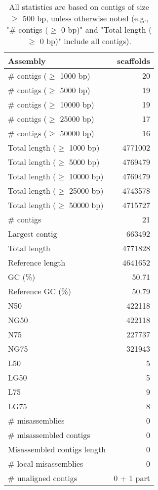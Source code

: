 \documentclass[12pt,a4paper]{article}
\begin{document}
\begin{table}[ht]
\begin{center}
\caption{All statistics are based on contigs of size $\geq$ 500 bp, unless otherwise noted (e.g., "\# contigs ($\geq$ 0 bp)" and "Total length ($\geq$ 0 bp)" include all contigs).}
\begin{tabular}{|l*{1}{|r}|}
\hline
Assembly & scaffolds \\ \hline
\# contigs ($\geq$ 1000 bp) & 20 \\ \hline
\# contigs ($\geq$ 5000 bp) & 19 \\ \hline
\# contigs ($\geq$ 10000 bp) & 19 \\ \hline
\# contigs ($\geq$ 25000 bp) & 17 \\ \hline
\# contigs ($\geq$ 50000 bp) & 16 \\ \hline
Total length ($\geq$ 1000 bp) & 4771002 \\ \hline
Total length ($\geq$ 5000 bp) & 4769479 \\ \hline
Total length ($\geq$ 10000 bp) & 4769479 \\ \hline
Total length ($\geq$ 25000 bp) & 4743578 \\ \hline
Total length ($\geq$ 50000 bp) & 4715727 \\ \hline
\# contigs & 21 \\ \hline
Largest contig & 663492 \\ \hline
Total length & 4771828 \\ \hline
Reference length & 4641652 \\ \hline
GC (\%) & 50.71 \\ \hline
Reference GC (\%) & 50.79 \\ \hline
N50 & 422118 \\ \hline
NG50 & 422118 \\ \hline
N75 & 227737 \\ \hline
NG75 & 321943 \\ \hline
L50 & 5 \\ \hline
LG50 & 5 \\ \hline
L75 & 9 \\ \hline
LG75 & 8 \\ \hline
\# misassemblies & 0 \\ \hline
\# misassembled contigs & 0 \\ \hline
Misassembled contigs length & 0 \\ \hline
\# local misassemblies & 0 \\ \hline
\# unaligned contigs & 0 + 1 part \\ \hline

\end{tabular}
\end{center}
\end{table}
\end{document}
